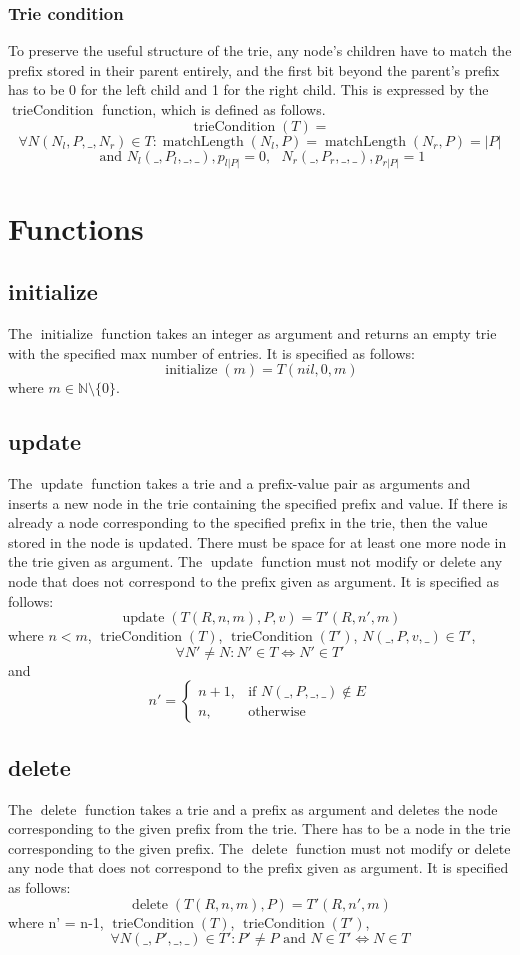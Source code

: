 \documentclass{article}
\DeclareMathOperator{\matchlength}{matchLength}
\DeclareMathOperator{\triecond}{trieCondition}
\DeclareMathOperator{\initialize}{initialize}
\DeclareMathOperator{\update}{update}
\DeclareMathOperator{\delete}{delete}
\begin{document}
\subsubsection{Trie condition}
To preserve the useful structure of the trie, any node's children have to match
the prefix stored in their parent entirely, and the first bit beyond the
parent's prefix has to be 0 for the left child and 1 for the right child.
This is expressed by the $\triecond$ function, which is defined as follows.
\[
    \triecond(T) =
\]
\[
    \forall N(N_l, P, \_, N_r) \in T: \matchlength(N_l, P) = \matchlength(N_r, P) = |P|
\]
\[
    \text{ and } N_l(\_, P_l, \_, \_), p_{l|P|} = 0, \text{ } N_r(\_, P_r, \_, \_), p_{r|P|} = 1
\]
\section{Functions}
\subsection{initialize}
The $\initialize$ function takes an integer as argument and returns an empty trie
with the specified max number of entries. It is specified as follows:
\[
    \initialize(m) = T(nil, 0, m)
\]
where $m \in \mathbb{N} \setminus \{0\}$.
\subsection{update}
The $\update$ function takes a trie and a prefix-value pair as arguments and
inserts a new node in the trie containing the specified prefix and value. If
there is already a node corresponding to the specified prefix in the trie, then
the value stored in the node is updated. There must be space for at least one
more node in the trie given as argument. The $\update$ function must not modify
or delete any node that does not correspond to the prefix given as argument. It
is specified as follows:
\[
    \update(T(R, n, m), P, v) = T'(R, n', m)
\]
where $n < m$, $\triecond(T)$, $\triecond(T')$, $N(\_, P, v, \_) \in T'$,
\[
    \forall N' \neq N: N' \in T \Leftrightarrow N' \in T'
\]
and
\[
    n'=
    \begin{cases}
    n+1,   & \text{if } N(\_, P, \_, \_) \notin E\\
    n,  & \text{otherwise}
    \end{cases}
\]
\subsection{delete}
The $\delete$ function takes a trie and a prefix as argument and deletes the
node corresponding to the given prefix from the trie. There has to be a node in
the trie corresponding to the given prefix. The $\delete$ function must not
modify or delete any node that does not correspond to the prefix given as
argument. It is specified as follows:
\[
    \delete(T(R, n, m), P) = T'(R, n', m)
\]
where n' = n-1, $\triecond(T)$, $\triecond(T')$,
\[
    \forall N(\_, P', \_, \_) \in T': P' \neq P \text{ and }
    N \in T' \Leftrightarrow N \in T
\]
\end{document}
